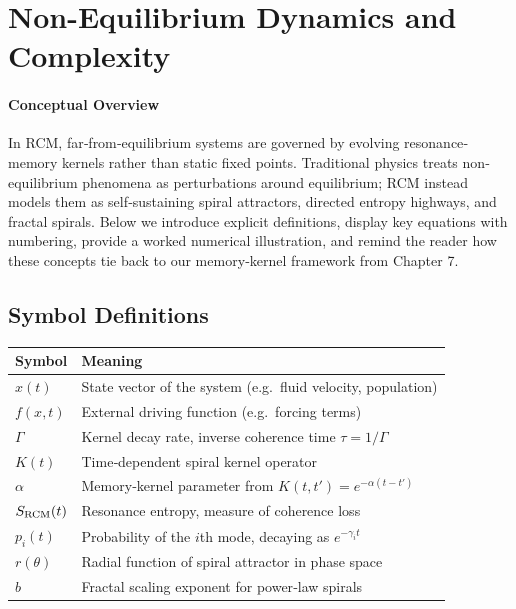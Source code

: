\section{Non-Equilibrium Dynamics and Complexity}

\paragraph{Conceptual Overview}
In RCM, far‐from‐equilibrium systems are governed by evolving resonance‐memory kernels rather than static fixed points. Traditional physics treats non‐equilibrium phenomena as perturbations around equilibrium; RCM instead models them as self‐sustaining spiral attractors, directed entropy highways, and fractal spirals. Below we introduce explicit definitions, display key equations with numbering, provide a worked numerical illustration, and remind the reader how these concepts tie back to our memory‐kernel framework from Chapter 7.

\subsection{Symbol Definitions}
\begin{table}[h]
  \centering
  \small
  \begin{tabular}{ll}
    \toprule
    Symbol & Meaning \\
    \midrule
    $x(t)$           & State vector of the system (e.g.\ fluid velocity, population) \\
    $f(x,t)$         & External driving function (e.g.\ forcing terms) \\
    $\Gamma$         & Kernel decay rate, inverse coherence time $\tau=1/\Gamma$ \\
    $K(t)$           & Time‐dependent spiral kernel operator \\
    $\alpha$         & Memory‐kernel parameter from $K(t,t')=e^{-\alpha(t-t')}$ \\
    $S_{\rm RCM}(t)$ & Resonance entropy, measure of coherence loss \\
    $p_i(t)$         & Probability of the $i$th mode, decaying as $e^{-\gamma_i t}$ \\
    $r(\theta)$      & Radial function of spiral attractor in phase space \\
    $b$              & Fractal scaling exponent for power‐law spirals \\
    \bottomrule
  \end{tabular}
\end{table}

